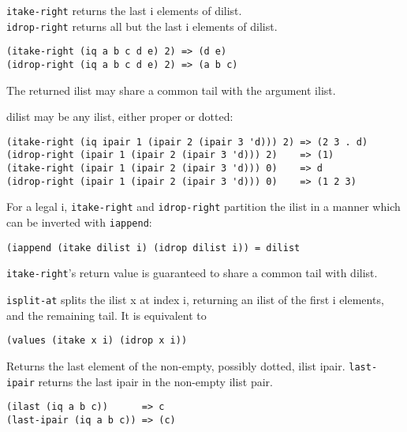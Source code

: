 \begin{entry}{%
  }

  \texttt{itake-right} returns the last i elements of dilist.\\
  \texttt{idrop-right} returns all but the last i elements of dilist.

\begin{verbatim}
(itake-right (iq a b c d e) 2) => (d e)
(idrop-right (iq a b c d e) 2) => (a b c)
\end{verbatim}

  The returned ilist may share a common tail with the argument ilist.

  dilist may be any ilist, either proper or dotted:

\begin{verbatim}
(itake-right (iq ipair 1 (ipair 2 (ipair 3 'd))) 2) => (2 3 . d)
(idrop-right (ipair 1 (ipair 2 (ipair 3 'd))) 2)    => (1)
(itake-right (ipair 1 (ipair 2 (ipair 3 'd))) 0)    => d
(idrop-right (ipair 1 (ipair 2 (ipair 3 'd))) 0)    => (1 2 3)
\end{verbatim}

  For a legal i, \texttt{itake-right} and \texttt{idrop-right}
  partition the ilist in a manner which can be inverted with
  \texttt{iappend}:

\begin{verbatim}
(iappend (itake dilist i) (idrop dilist i)) = dilist
\end{verbatim}

  \texttt{itake-right}'s return value is guaranteed to share a common
  tail with dilist.
\end{entry}

\begin{entry}{%
  }

  \texttt{isplit-at} splits the ilist x at index i, returning an ilist
  of the first i elements, and the remaining tail. It is equivalent to

\begin{verbatim}
(values (itake x i) (idrop x i))
\end{verbatim}
\end{entry}

\begin{entry}{%
  }

  Returns the last
  element of the non-empty, possibly dotted, ilist ipair.
  \texttt{last-ipair} returns the last ipair in the non-empty ilist
  pair.

\begin{verbatim}
(ilast (iq a b c))      => c
(last-ipair (iq a b c)) => (c)
\end{verbatim}
\end{entry}

